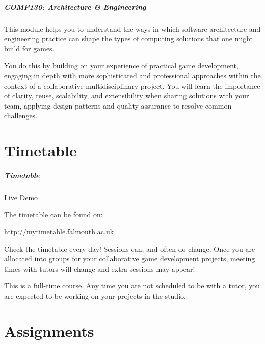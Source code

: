 \begin{frame}
	\frametitle{\Large{COMP130: Architecture \& Engineering}}
	
	This module helps you to understand the ways in which software architecture and engineering practice can shape the types of computing solutions that one might build for games.
	
	\vspace{2em}
	
	You do this by building on your experience of practical game development, engaging in depth with more sophisticated and professional approaches within the context of a collaborative multidisciplinary project. You will learn the importance of clarity, reuse, scalability, and extensibility when sharing solutions with your team, applying design patterns and quality assurance to resolve common challenges.

\end{frame}

\part{Timetable}
\frame{\partpage}

\begin{frame}
	\frametitle{Timetable}
	
	Live Demo
	
	\vspace{3em}
	
	The timetable can be found on:
	
	\vspace{0.5em}
	
	\indent \url{http://mytimetable.falmouth.ac.uk}
	
	\vspace{0.5em}
	
	Check the timetable every day! Sessions can, and often do change. Once you are allocated into groups for your collaborative game development projects, meeting times with tutors will change and extra sessions may appear!
	
	\vspace{0.5em}
	
	 This is a full-time course. Any time you are not scheduled to be with a tutor, you are expected to be working on your projects in the studio.
	
\end{frame}

\part{Assignments}
\frame{\partpage}

